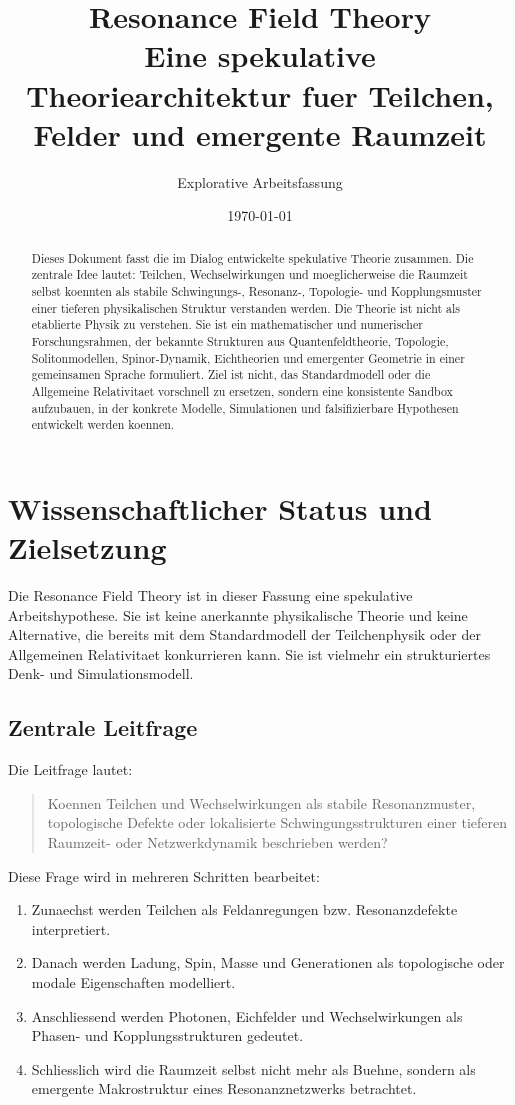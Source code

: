 \documentclass[11pt,a4paper]{article}
\title{\textbf{Resonance Field Theory}\\
\large Eine spekulative Theoriearchitektur fuer Teilchen, Felder und emergente Raumzeit}
\author{Explorative Arbeitsfassung}
\date{\today}
\newcommand{\RFT}{Resonance Field Theory}
\begin{document}
\maketitle

\begin{abstract}
Dieses Dokument fasst die im Dialog entwickelte spekulative Theorie zusammen. Die zentrale Idee lautet:
Teilchen, Wechselwirkungen und moeglicherweise die Raumzeit selbst koennten als stabile Schwingungs-, Resonanz-,
Topologie- und Kopplungsmuster einer tieferen physikalischen Struktur verstanden werden. Die Theorie ist nicht
als etablierte Physik zu verstehen. Sie ist ein mathematischer und numerischer Forschungsrahmen, der bekannte
Strukturen aus Quantenfeldtheorie, Topologie, Solitonmodellen, Spinor-Dynamik, Eichtheorien und emergenter
Geometrie in einer gemeinsamen Sprache formuliert. Ziel ist nicht, das Standardmodell oder die Allgemeine
Relativitaet vorschnell zu ersetzen, sondern eine konsistente Sandbox aufzubauen, in der konkrete Modelle,
Simulationen und falsifizierbare Hypothesen entwickelt werden koennen.
\end{abstract}

\tableofcontents
\newpage

\section{Wissenschaftlicher Status und Zielsetzung}

Die \RFT{} ist in dieser Fassung eine spekulative Arbeitshypothese. Sie ist keine anerkannte physikalische Theorie
und keine Alternative, die bereits mit dem Standardmodell der Teilchenphysik oder der Allgemeinen Relativitaet
konkurrieren kann. Sie ist vielmehr ein strukturiertes Denk- und Simulationsmodell.

\subsection{Zentrale Leitfrage}

Die Leitfrage lautet:

\begin{quote}
Koennen Teilchen und Wechselwirkungen als stabile Resonanzmuster, topologische Defekte oder lokalisierte
Schwingungsstrukturen einer tieferen Raumzeit- oder Netzwerkdynamik beschrieben werden?
\end{quote}

Diese Frage wird in mehreren Schritten bearbeitet:
\begin{enumerate}
  \item Zunaechst werden Teilchen als Feldanregungen bzw. Resonanzdefekte interpretiert.
  \item Danach werden Ladung, Spin, Masse und Generationen als topologische oder modale Eigenschaften modelliert.
  \item Anschliessend werden Photonen, Eichfelder und Wechselwirkungen als Phasen- und Kopplungsstrukturen gedeutet.
  \item Schliesslich wird die Raumzeit selbst nicht mehr als Buehne, sondern als emergente Makrostruktur eines Resonanznetzwerks betrachtet.
\end{enumerate}
\end{document}
